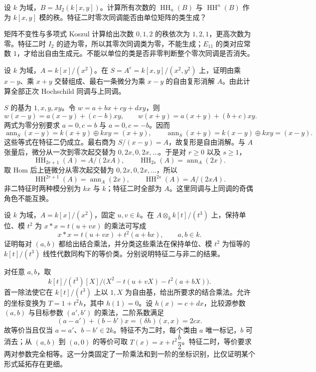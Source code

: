 \begin{optionalexercise}\label{b4:ex:12-matrix-polynomial}
	设 \(k\) 为域，\(B=M_2(k[x,y])\)。计算所有次数的 \(\operatorname{HH}_n(B)\) 与 \(\operatorname{HH}^n(B)\) 作为 \(k[x,y]\) 模的秩。特征二时零次同调能否由单位矩阵的类生成？
\end{optionalexercise}
\begin{solution}
	矩阵不变性与多项式 Koszul 计算给出次数 \(0,1,2\) 的秩依次为 \(1,2,1\)，更高次数为零。特征二时 \(I_2\) 的迹为零，所以其零次同调类为零，不能生成；\(E_{11}\) 的类对应常数 \(1\)，才给出自由生成元。不能以单位的类是否非零判断整个零次同调是否消失。
\end{solution}

\begin{optionalexercise}\label{b4:ex:12-dual-periodic-hh}
	设 \(k\) 为域，\(A=k[x]/(x^2)\)。在 \(S=A^e=k[x,y]/(x^2,y^2)\) 上，证明由乘 \(x-y\)、乘 \(x+y\) 交替组成、最右一条微分为乘 \(x-y\) 的自由复形消解 \(A\)。由此计算全部正次 Hochschild 同调与上同调。
\end{optionalexercise}
\begin{solution}
	\(S\) 的基为 \(1,x,y,xy\)。令 \(w=a+bx+cy+dxy\)，则
	\[
		w(x-y)=a(x-y)+(c-b)xy,\qquad w(x+y)=a(x+y)+(b+c)xy.
	\]
	两式为零分别要求 \(a=0,c=b\) 与 \(a=0,c=-b\)。因而
	\[
		\operatorname{ann}_S(x-y)=k(x+y)\oplus kxy=(x+y),\qquad \operatorname{ann}_S(x+y)=k(x-y)\oplus kxy=(x-y).
	\]
	这些等式在特征二仍成立。最右商为 \(S/(x-y)=A\)，故复形是自由消解。与 \(A\) 张量后，微分从一次到零次起交替为 \(0,2x,0,2x,\ldots\)。于是对 \(r\ge0\) 以及 \(s\ge1\)，
	\[
		\operatorname{HH}_{2r+1}(A)=A/(2xA),\qquad \operatorname{HH}_{2s}(A)=\operatorname{ann}_A(2x).
	\]
	取 Hom 后上链微分从零次起交替为 \(0,2x,0,2x,\ldots\)，所以
	\[
		\operatorname{HH}^{2r+1}(A)=\operatorname{ann}_A(2x),\qquad \operatorname{HH}^{2s}(A)=A/(2xA).
	\]
	非二特征时两种模分别为 \(kx\) 与 \(k\)；特征二时全部为 \(A\)。这里同调与上同调的奇偶角色不能互换。
\end{solution}

\begin{optionalexercise}\label{b4:ex:12-nonzero-hh3-extension}
	设 \(k\) 为域，\(A=k[x]/(x^2)\)，固定 \(u,v\in k\)。在 \(A\otimes_k k[t]/(t^3)\) 上，保持单位、模 \(t^2\) 为 \(x*x=t(u+vx)\) 的乘法可写成
	\[
		x*x=t(u+vx)+t^2(a+bx),\qquad a,b\in k.
	\]
	证明每对 \((a,b)\) 都给出结合乘法，并分类这些乘法在保持单位、模 \(t^2\) 为恒等的 \(k[t]/(t^3)\) 线性代数同构下的等价类。分别说明特征二与非二的结果。
\end{optionalexercise}
\begin{solution}
	对任意 \(a,b\)，取
	\[
		k[t]/(t^3)[X]/\bigl(X^2-t(u+vX)-t^2(a+bX)\bigr).
	\]
	首一除法使它在 \(k[t]/(t^3)\) 上以 \(1,X\) 为自由基，给出所要求的结合乘法。允许的坐标变换为 \(T=1+t^2h\)，其中 \(h(1)=0\)。设 \(h(x)=c+dx\)，比较源参数 \((a,b)\) 与目标参数 \((a',b')\) 的乘法，二阶系数满足
	\[
		(a-a')+(b-b')x=(\delta h)(x,x)=2cx.
	\]
	故等价当且仅当 \(a=a'\)、\(b-b'\in2k\)。特征不为二时，每个类由 \(a\) 唯一标记，\(b\) 可消去；从 \((a,b)\) 到 \((a,0)\) 的等价可取 \(T(x)=x+t^2\dfrac b2\)。特征二时，等价要求两对参数完全相等。这一分类固定了一阶乘法和到一阶的坐标识别，比仅证明某个形式延拓存在更细。
\end{solution}


